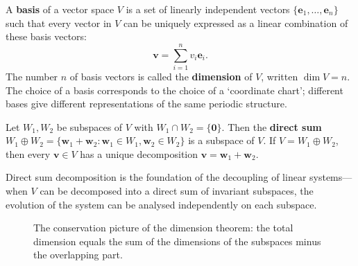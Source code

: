 \begin{definition}\label{def:basis_dimension}
A \textbf{basis} of a vector space $V$ is a set of linearly independent vectors $\{\mathbf{e}_1, \dots, \mathbf{e}_n\}$ such that every vector in $V$ can be uniquely expressed as a linear combination of these basis vectors:
\[
\mathbf{v} = \sum_{i=1}^n v_i \mathbf{e}_i.
\]
The number $n$ of basis vectors is called the \textbf{dimension} of $V$, written $\dim V = n$. The choice of a basis corresponds to the choice of a `coordinate chart'; different bases give different representations of the same periodic structure.
\end{definition}

\begin{definition}\label{def:direct_sum}
Let $W_1, W_2$ be subspaces of $V$ with $W_1 \cap W_2 = \{\mathbf{0}\}$. Then the \textbf{direct sum} $W_1 \oplus W_2 = \{\mathbf{w}_1 + \mathbf{w}_2 : \mathbf{w}_1 \in W_1, \mathbf{w}_2 \in W_2\}$ is a subspace of $V$. If $V = W_1 \oplus W_2$, then every $\mathbf{v} \in V$ has a unique decomposition $\mathbf{v} = \mathbf{w}_1 + \mathbf{w}_2$.

Direct sum decomposition is the foundation of the decoupling of linear systems---when $V$ can be decomposed into a direct sum of invariant subspaces, the evolution of the system can be analysed independently on each subspace.
\end{definition}

\begin{figure}[htbp]
\centering
{}
\caption{The conservation picture of the dimension theorem: the total dimension equals the sum of the dimensions of the subspaces minus the overlapping part.}
\label{fig:dimension_conservation}
\end{figure}



